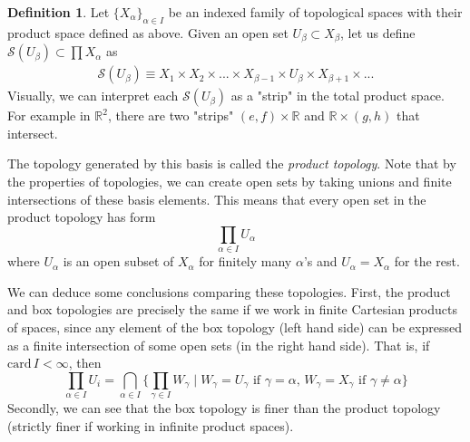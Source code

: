 \documentclass{article}
\theoremstyle{remark}
\theoremstyle{definition}
\newtheorem{definition}{Definition}[section]
\begin{document}
\begin{definition}
Let $\{X_\alpha\}_{\alpha \in I}$ be an indexed family of topological spaces with their product space defined as above. Given an open set $U_\beta \subset X_\beta$, let us define $\mathscr{S} (U_\beta) \subset \prod X_\alpha$ as 
\begin{align*}
    \mathscr{S}(U_\beta) \equiv X_1 \times X_2 \times ... \times X_{\beta -1} \times U_\beta \times X_{\beta+1} \times ... 
\end{align*}
Visually, we can interpret each $\mathscr{S} (U_\beta)$ as a "strip" in the total product space. For example in $\mathbb{R}^2$, there are two "strips" $(e, f) \times \mathbb{R}$ and $\mathbb{R} \times (g, h)$ that intersect. 
\begin{center}
\end{center}
The topology generated by this basis is called the \textit{product topology}. Note that by the properties of topologies, we can create open sets by taking unions and finite intersections of these basis elements. This means that every open set in the product topology has form
\[\prod_{\alpha \in I} U_\alpha\]
where $U_\alpha$ is an open subset of $X_\alpha$ for finitely many $\alpha$'s and $U_\alpha = X_\alpha$ for the rest. 
\end{definition}

We can deduce some conclusions comparing these topologies. First, the product and box topologies are precisely the same if we work in finite Cartesian products of spaces, since any element of the box topology (left hand side) can be expressed as a finite intersection of some open sets (in the right hand side). That is, if $\text{card}\,I < \infty$, then 
\[\prod_{\alpha \in I} U_i = \bigcap_{\alpha \in I} \big\{ \prod_{\gamma \in I} W_\gamma \; | \; W_\gamma = U_\gamma \text{ if } \gamma = \alpha, \, W_\gamma = X_\gamma \text{ if } \gamma \neq \alpha\big\}\]
Secondly, we can see that the box topology is finer than the product topology (strictly finer if working in infinite product spaces). 
\end{document}
